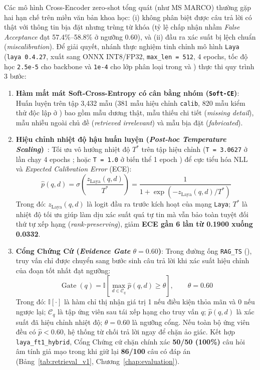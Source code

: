 Các mô hình Cross-Encoder zero-shot tổng quát (như MS MARCO) thường gặp hai hạn chế trên miền văn bản khoa học: (i) không phân biệt được câu trả lời có thật với thông tin bịa đặt nhưng trùng từ khóa (tỷ lệ chấp nhận nhầm \textit{False Acceptance} đạt 57.4\%--58.8\% ở ngưỡng 0.60), và (ii) đầu ra xác suất bị lệch chuẩn (\textit{miscalibration}). Để giải quyết, nhánh thực nghiệm tinh chỉnh mô hình \texttt{Laya} (\texttt{laya 0.4.27}, xuất sang ONNX INT8/FP32, \texttt{max\_len = 512}, 4 epochs, tốc độ học \texttt{2.5e-5} cho backbone và \texttt{1e-4} cho lớp phân loại trong  và ) thực thi quy trình 3 bước:
\begin{enumerate}[label=\textbf{\arabic*.}]
  \item \textbf{Hàm mất mát Soft-Cross-Entropy có cân bằng nhóm (\texttt{Soft-CE})}: Huấn luyện trên tập 3,432 mẫu (381 mẫu hiệu chỉnh \texttt{calib}, 820 mẫu kiểm thử độc lập ở ) bao gồm mẫu dương thật, mẫu thiếu chi tiết (\textit{missing detail}), mẫu nhiễu ngoài chủ đề (\textit{retrieved irrelevant}) và mẫu bịa đặt (\textit{fabricated}).
  \item \textbf{Hiệu chỉnh nhiệt độ hậu huấn luyện (\textit{Post-hoc Temperature Scaling})}~\cite{guo2017calibration}: Tối ưu vô hướng nhiệt độ $T^*$ trên tập hiệu chỉnh (\texttt{T = 3.0627} ở lần chạy 4 epochs ; hoặc \texttt{T = 1.0} ở biến thể 1 epoch ) để cực tiểu hóa NLL và \textit{Expected Calibration Error} (ECE):
  \begin{equation}
    \hat{p}(q, d) = \sigma\!\left(\frac{z_{\text{Laya}}(q, d)}{T^*}\right) = \frac{1}{1 + \exp\!\left(-z_{\text{Laya}}(q, d) / T^*\right)}
    \label{eq:ch4_temp_scaling}
  \end{equation}
  Trong đó: $z_{\text{Laya}}(q, d)$ là logit đầu ra trước kích hoạt của mạng \texttt{Laya}; $T^*$ là nhiệt độ tối ưu giúp làm dịu xác suất quá tự tin mà vẫn bảo toàn tuyệt đối thứ tự xếp hạng (\textit{rank-preserving}), giảm \textbf{ECE gần 6 lần từ 0.1900 xuống 0.0332}.
  \item \textbf{Cổng Chứng Cứ (\textit{Evidence Gate} $\theta = 0.60$)}: Trong đường ống \texttt{RAG\_TS} (), truy vấn chỉ được chuyển sang bước sinh câu trả lời khi xác suất hiệu chỉnh của đoạn tốt nhất đạt ngưỡng:
  \begin{equation}
    \operatorname{Gate}(q) = \mathbb{I}\!\left[\max_{d \in \mathcal{C}_q} \hat{p}(q, d) \ge \theta\right], \qquad \theta = 0.60
    \label{eq:ch4_evidence_gate}
  \end{equation}
  Trong đó: $\mathbb{I}[\cdot]$ là hàm chỉ thị nhận giá trị 1 nếu điều kiện thỏa mãn và 0 nếu ngược lại; $\mathcal{C}_q$ là tập ứng viên sau tái xếp hạng cho truy vấn $q$; $\hat{p}(q, d)$ là xác suất đã hiệu chỉnh nhiệt độ; $\theta = 0.60$ là ngưỡng cổng. Nếu toàn bộ ứng viên đều có $\hat{p} < 0.60$, hệ thống từ chối trả lời ngay để chặn ảo giác. Kết hợp \texttt{laya\_ft1\_hybrid}, Cổng Chứng cứ chặn chính xác \textbf{50/50 (100\%)} câu hỏi âm tính giả mạo trong khi giữ lại \textbf{86/100} câu có đáp án (Bảng~\ref{tab:retrieval_v1}, Chương~\ref{chap:evaluation}).
\end{enumerate}

